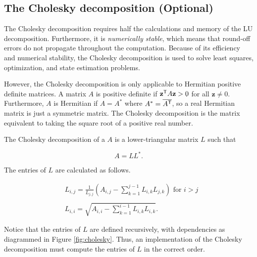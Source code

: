 \subsection*{The Cholesky decomposition (Optional)}
The Cholesky decomposition requires half the calculations and memory of the LU decomposition. 
Furthermore, it is \emph{numerically stable}, which means that round-off errors do not propagate throughout the computation. 
Because of its efficiency and numerical stability, the Cholesky decomposition is used to solve least squares, optimization, and state estimation problems.

However, the Cholesky decomposition is only applicable to Hermitian positive definite matrices. 
A matrix $A$ is positive definite if  $\mathbf{z}^{\mathsf T} A\mathbf{z} > 0$ for all $\mathbf{z} \neq 0$. 
Furthermore, $A$ is Hermitian if $A = A^*$ where $A^* = \overline{A^{\mathsf T} }$, so a real Hermitian matrix is just a symmetric matrix. 
The Cholesky decomposition is the matrix equivalent to taking the square root of a positive real number.

The Cholesky decomposition of a $A$ is a lower-triangular matrix $L$ such that

\begin{equation*}
 A = LL^*.
\end{equation*}

The entries of $L$ are calculated as follows.

\begin{align*}
&L_{i,j} = \frac{1}{L_{j,j}}\left(A_{i,j} -\sum_{k=1}^{j-1}{L_{i,k}L_{j,k}}\right) \mbox{ for $i>j$} \\ \\
&L_{i,i} = \sqrt{A_{i,i} - \sum_{k=1}^{i-1}{L_{i,k}L_{i,k}}}.
\end{align*}

Notice that the entries of $L$ are defined recursively, with dependencies as diagrammed in Figure \ref{fig:cholesky}. 
Thus, an implementation of the Cholesky decomposition must compute the entries of $L$ in the correct order.

